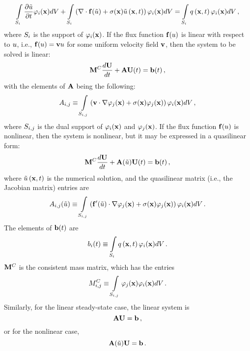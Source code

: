 \begin{equation}
   \intSi\ppt{\approximatescalarsolution}\testfunction_i(\x) d\volume
      + \intSi\left(\divergence\consfluxscalar[\approximatescalarsolution]
      + \reactioncoef(\x)\approximatescalarsolution\xt\right)
      \testfunction_i(\x) d\volume
      = \intSi \scalarsource\xt \testfunction_i(\x) d\volume \eqc
\end{equation}
where $\support_i$ is the support of $\testfunction_i(\x)$. If the flux
function $\consfluxscalar$ is linear with respect to $\scalarsolution$, i.e.,
$\consfluxscalar = \velocity\scalarsolution$ for some uniform velocity field
$\velocity$, then the system to be solved is linear:
\begin{equation}\label{eq:semidiscrete}
  \consistentmassmatrix\ddt{\solutionvector}+\ssmatrix\solutionvector(t)
  = \ssrhs(\timevalue) \eqc
\end{equation}
with the elements of $\ssmatrix$ being the following:
\begin{equation}\label{eq:Aij}
  \ssmatrixletter\ij \equiv \intSij\left(
  \velocity\cdot\nabla\testfunction_j(\x) +
  \reactioncoef(\x)\testfunction_j(\x)\right)\testfunction_i(\x) d\volume \eqc
\end{equation}
where $\support\ij$ is the dual support of $\testfunction_i(\x)$ and
$\testfunction_j(\x)$.
If the flux function $\consfluxscalar$ is nonlinear, then the system is
nonlinear, but it may be expressed in a quasilinear form:
\begin{equation}\label{eq:semi_quasilinear}
   \consistentmassmatrix\ddt{\solutionvector}
   + \ssmatrix(\approximatescalarsolution)\solutionvector(\timevalue)
   = \ssrhs(\timevalue) \eqc
\end{equation}
where $\approximatescalarsolution\xt$ is the numerical solution, and the
quasilinear matrix (i.e., the Jacobian matrix) entries are
\begin{equation}\label{eq:Aij_nonlinear}
  \ssmatrixletter\ij(\approximatescalarsolution) \equiv \intSij\left(
  \mathbf{\consfluxletter}'(\approximatescalarsolution)\cdot\nabla
  \testfunction_j(\x) +
  \reactioncoef(\x)\testfunction_j(\x)\right)
  \testfunction_i(\x) d\volume \eqp
\end{equation}
The elements of $\ssrhs(\timevalue)$ are
\begin{equation}
  \ssrhsletter_i(\timevalue) \equiv \intSi \scalarsource\xt\testfunction_i(\x)
  d\volume \eqp
\end{equation}
$\consistentmassmatrix$ is the consistent mass matrix, which has the entries
\begin{equation}\label{eq:massmatrix}
  \massmatrixletter^C\ij \equiv \intSij
  \testfunction_j(\x)\testfunction_i(\x) d\volume \eqp
\end{equation}
Similarly, for the linear steady-state case, the linear system is
\begin{equation}
  \ssmatrix\solutionvector = \ssrhs \eqc
\end{equation}
or for the nonlinear case,
\begin{equation}
  \ssmatrix(\approximatescalarsolution)\solutionvector = \ssrhs \eqp
\end{equation}
